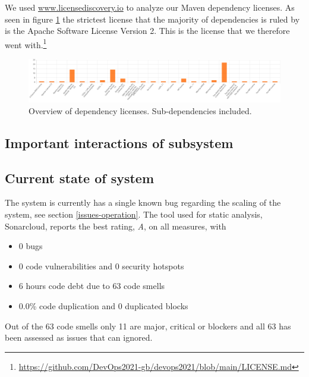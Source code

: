 

We used \url{www.licensediscovery.io} to analyze our Maven dependency licenses. As seen in figure \ref{fig:licenceDep} the strictest license that the majority of dependencies is ruled by is the Apache Software License Version 2. This is the license that we therefore went with.\footnote{\url{https://github.com/DevOps2021-gb/devops2021/blob/main/LICENSE.md}} 
\begin{figure}[!htb]
    \centering
    \includegraphics[scale=0.2]{images/LicenceDependencies.png}
    \caption{Overview of dependency licenses. Sub-dependencies included.}
    \label{fig:licenceDep}
\end{figure}


\subsection{Important interactions of subsystem}

\subsection{Current state of system}
The system is currently has a single known bug regarding the scaling of the system, see section \ref{issues-operation}. The tool used for static analysis, Sonarcloud, reports the best rating, \textit{A}, on all measures, with 

\begin{itemize}
    \item 0 bugs
    \item 0 code vulnerabilities and 0 security hotspots
    \item 6 hours code debt due to 63 code smells
    \item 0.0\% code duplication and 0 duplicated blocks
\end{itemize}

Out of the 63 code smells only 11 are major, critical or blockers and all 63 has been assessed as issues that can ignored.

